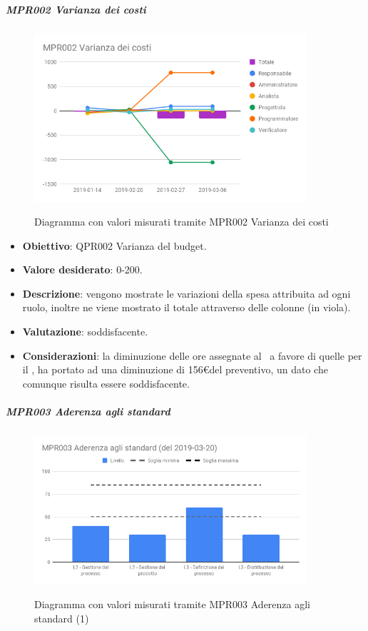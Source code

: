 	\subparagraph{MPR002 Varianza dei costi}

	\begin{figure}[H]
		\centering
		\includegraphics[width=0.9\textwidth]{img/cruscotti/MPR002.png}
		\label{immagineVarianzaCosti}
		\caption{Diagramma con valori misurati tramite MPR002 Varianza dei costi}
	\end{figure}

	\begin{itemize}
		\item \textbf{Obiettivo}: QPR002 Varianza del budget.
		\item \textbf{Valore desiderato}: 0-200\EUR.
		\item \textbf{Descrizione}: vengono mostrate le variazioni della spesa attribuita ad ogni ruolo, inoltre ne viene mostrato il totale attraverso delle colonne (in viola).
		\item \textbf{Valutazione}: soddisfacente.
		\item \textbf{Considerazioni}: la diminuzione delle ore assegnate al \Prog\ a favore di quelle per il \Progr, ha portato ad una diminuzione di 156\euro del preventivo, un dato che comunque risulta essere soddisfacente.
	\end{itemize}
	

	\subparagraph{MPR003 Aderenza agli standard}

	\begin{figure}[H]
		\centering
		\includegraphics[width=0.9\textwidth]{img/cruscotti/MPR003_(1).png}
		\label{immagineAderenzaStandard1}
		\caption{Diagramma con valori misurati tramite MPR003 Aderenza agli standard (1)}
	\end{figure}

